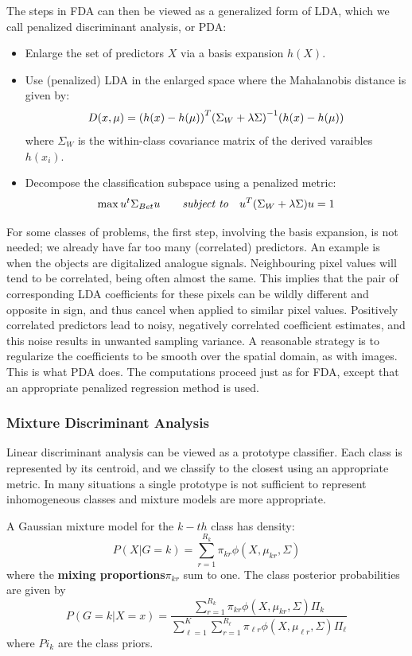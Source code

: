 The steps in FDA can then be viewed as a generalized form of LDA, which we call penalized discriminant analysis, or PDA:
\begin{itemize}
\item Enlarge the set of predictors $X$ via a basis expansion $h(X)$.
\item Use (penalized) LDA in the enlarged space where the Mahalanobis distance is given by:
\begin{equation}
D(x, \mu) = \br{h(x) - h(\mu)}^T\br{\Sigma_W+\lambda\Sigma}^{-1} \br{h(x) - h(\mu)}
\end{equation}
where $\Sigma_W$ is the within-class covariance matrix of the derived varaibles $h(x_i)$.
\item Decompose the classification subspace using a penalized metric:
\begin{equation}
\max u^t\Sigma_{Bet}u \quad\quad \textit{subject to} \quad u^T\br{\Sigma_W+\lambda\Sigma}u =1
\end{equation}
\end{itemize}
For some classes of problems, the first step, involving the basis expansion, is not needed; we already have far too many (correlated) predictors. An example is when the objects are digitalized analogue signals. Neighbouring pixel values will tend to be correlated, being often almost the same. This implies that the pair of corresponding LDA coefficients for these pixels can be wildly different and opposite in sign, and thus cancel when applied to similar pixel values. Positively correlated predictors lead to noisy, negatively correlated coefficient estimates, and this noise results in unwanted sampling variance. A reasonable strategy is to regularize the coefficients to be smooth over the spatial domain, as with images. This is what PDA does. The computations proceed just as for FDA, except that an appropriate penalized regression method is used.

\subsubsection{Mixture Discriminant Analysis}
Linear discriminant analysis can be viewed as a prototype classifier. Each class is represented by its centroid, and we classify to the closest using an appropriate metric. In many situations a single prototype is not sufficient to represent inhomogeneous classes and mixture models are more appropriate.

A Gaussian mixture model for the $k-th$ class has density:
\begin{equation}
P(X|G=k) = \sum_{r=1}^{R_k} \pi_{kr}\phi(X, \mu_{kr},\Sigma)
\end{equation}
where the \textbf{mixing proportions}$\pi_{kr}$ sum to one. The class posterior probabilities are given by
\begin{equation}
P(G=k|X=x) = \frac{\sum_{r=1}^{R_k} \pi_{kr}\phi(X, \mu_{kr},\Sigma)\Pi_k}{\sum_{\ell=1}^K\sum_{r=1}^{R_\ell} \pi_{\ell r}\phi(X, \mu_{\ell r},\Sigma)\Pi_\ell}
\end{equation}
where $Pi_k$ are the class priors.

